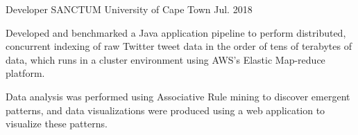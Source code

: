 
\begin{cventries}

  \cventry
    {Developer} %
    {SANCTUM} %
    {University of Cape Town} %
    {Jul. 2018} %
    {
      \begin{cvitems} %
        \item {Developed and benchmarked a Java application pipeline to perform distributed, concurrent indexing of raw Twitter tweet data in the order of tens of terabytes of data, which runs in a cluster environment using AWS's Elastic Map-reduce platform.}
        \item {Data analysis was performed using Associative Rule mining to discover emergent patterns, and data visualizations were produced using a web application to visualize these patterns.}
      \end{cvitems}
    }
\end{cventries}
